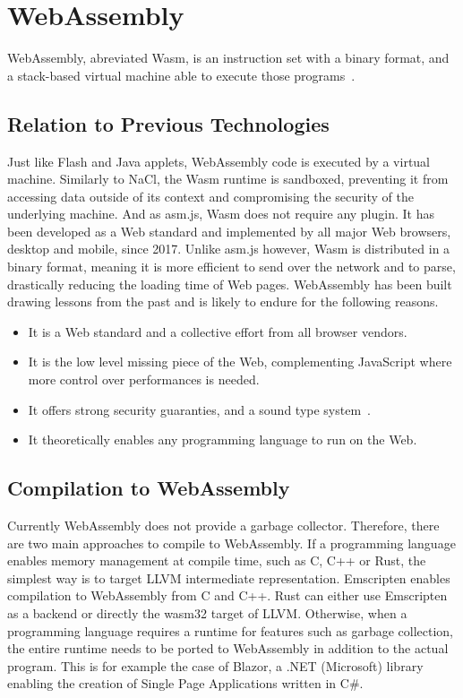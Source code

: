 \section{WebAssembly}%
\label{sec:WebAssembly}

WebAssembly, abreviated Wasm, is an instruction set with a binary format,
and a stack-based virtual machine able to execute those programs~\cite{haas2017bringing}.

\subsection{Relation to Previous Technologies}%
\label{sub:wasm_previous}

Just like Flash and Java applets, WebAssembly code
is executed by a virtual machine.
Similarly to NaCl, the Wasm runtime is sandboxed,
preventing it from accessing data outside of its context
and compromising the security of the underlying machine.
And as asm.js, Wasm does not require any plugin.
It has been developed as a Web standard and implemented
by all major Web browsers, desktop and mobile, since 2017.
Unlike asm.js however, Wasm is distributed in a binary format,
meaning it is more efficient to send over the network and to parse,
drastically reducing the loading time of Web pages.
WebAssembly has been built drawing lessons from the past and is likely to endure
for the following reasons.

\begin{itemize}
	\item It is a Web standard and a collective effort from all browser vendors.
	\item It is the low level missing piece of the Web,
		complementing JavaScript where more control over performances is needed.
	\item It offers strong security guaranties, and a sound type system~\cite{watt2018mechanising}.
	\item It theoretically enables any programming language to run on the Web.
\end{itemize}

\subsection{Compilation to WebAssembly}%
\label{sub:compile-wasm}

Currently WebAssembly does not provide a garbage collector.
Therefore, there are two main approaches to compile to WebAssembly.
If a programming language enables memory management at compile time,
such as C, C++ or Rust, the simplest way is to target LLVM intermediate representation.
Emscripten enables compilation to WebAssembly from C and C++.
Rust can either use Emscripten as a backend or directly the wasm32 target of LLVM.\@
Otherwise, when a programming language requires a runtime for features such as garbage collection,
the entire runtime needs to be ported to WebAssembly in addition to the actual program.
This is for example the case of Blazor, a .NET (Microsoft) library
enabling the creation of Single Page Applications written in C\#.

